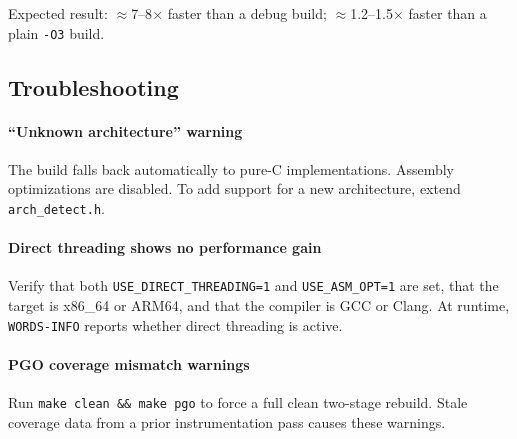 Expected result: \(\approx\)7--8\(\times\) faster than a debug build;
\(\approx\)1.2--1.5\(\times\) faster than a plain \texttt{-O3} build.

\subsection{Troubleshooting}
\label{sec:build-trouble}

\paragraph{``Unknown architecture'' warning}
The build falls back automatically to pure-C implementations. Assembly
optimizations are disabled. To add support for a new architecture, extend
\texttt{arch\_detect.h}.

\paragraph{Direct threading shows no performance gain}
Verify that both \texttt{USE\_DIRECT\_THREADING=1} and \texttt{USE\_ASM\_OPT=1}
are set, that the target is x86\_64 or ARM64, and that the compiler is GCC or
Clang. At runtime, \texttt{WORDS-INFO} reports whether direct threading is
active.

\paragraph{PGO coverage mismatch warnings}
Run \texttt{make clean \&\& make pgo} to force a full clean two-stage rebuild.
Stale coverage data from a prior instrumentation pass causes these warnings.
